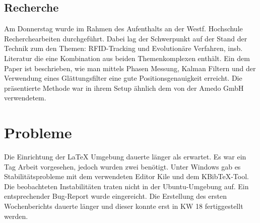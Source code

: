 \documentclass[a4paper,12pt,fleqn]{article}
\begin{document}
\subsection{Recherche}
Am Donnerstag wurde im Rahmen des Aufenthalts an der Westf. Hochschule Recherchearbeiten durchgeführt. Dabei lag der
Schwerpunkt auf der Stand der Technik zum den Themen: RFID-Tracking und Evolutionäre Verfahren, insb. Literatur die eine Kombination aus beiden
Themenkomplexen enthält. Ein dem Paper \cite{KALMANandSMOOTHING} ist beschrieben, wie man mittels Phasen Messung, Kalman Filtern \cite{Wiki:1} und der
Verwendung eines Glättungsfilter eine gute Positionsgenauigkeit erreicht. Die präsentierte Methode war in ihrem Setup ähnlich dem von der Amedo GmbH verwendetem.

\section[Probleme]{Probleme}
Die Einrichtung der \LaTeX{} Umgebung dauerte länger als erwartet. Es war ein
Tag Arbeit vorgesehen, jedoch wurden zwei benötigt.
Unter Windows gab es Stabilitätsprobleme mit dem verwendeten Editor Kile und dem KBibTeX-Tool.
Die beobachteten Instabilitäten traten nicht in der Ubuntu-Umgebung auf. Ein entsprechender Bug-Report wurde eingereicht.
Die Erstellung des ersten Wochenberichts dauerte länger und dieser konnte erst in KW 18 fertiggestellt werden.



\newpage


\end{document}
